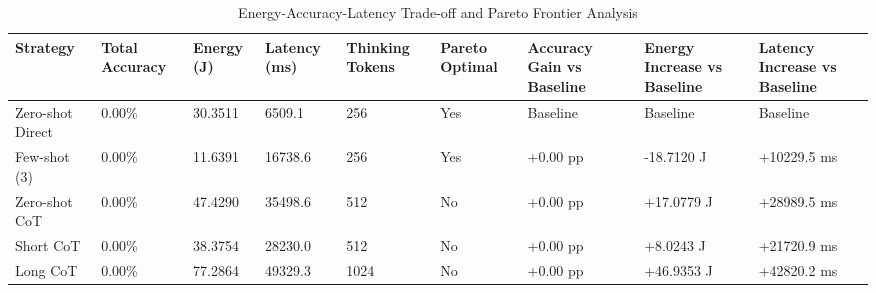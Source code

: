 \begin{table}
\caption{Energy-Accuracy-Latency Trade-off and Pareto Frontier Analysis}
\label{tab:tradeoff_comparison}
\begin{tabular}{lllllllll}
\toprule
Strategy & Total Accuracy & Energy (J) & Latency (ms) & Thinking Tokens & Pareto Optimal & Accuracy Gain vs Baseline & Energy Increase vs Baseline & Latency Increase vs Baseline \\
\midrule
Zero-shot Direct & 0.00\% & 30.3511 & 6509.1 & 256 & Yes & Baseline & Baseline & Baseline \\
Few-shot (3) & 0.00\% & 11.6391 & 16738.6 & 256 & Yes & +0.00 pp & -18.7120 J & +10229.5 ms \\
Zero-shot CoT & 0.00\% & 47.4290 & 35498.6 & 512 & No & +0.00 pp & +17.0779 J & +28989.5 ms \\
Short CoT & 0.00\% & 38.3754 & 28230.0 & 512 & No & +0.00 pp & +8.0243 J & +21720.9 ms \\
Long CoT & 0.00\% & 77.2864 & 49329.3 & 1024 & No & +0.00 pp & +46.9353 J & +42820.2 ms \\
\bottomrule
\end{tabular}
\end{table}
